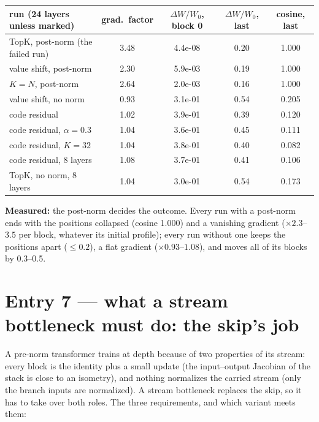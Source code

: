 \documentclass[11pt,a4paper]{article}
\begin{document}
\begin{center}\small
\begin{tabular}{lcccc}
\toprule
run (24 layers unless marked) & grad.\ factor & \(\Delta W/W_0\), block 0 & \(\Delta W/W_0\), last & cosine, last \\
\midrule
TopK, post-norm (the failed run) & 3.48 & 4.4e{-}08 & 0.20 & 1.000 \\
value shift, post-norm & 2.30 & 5.9e{-}03 & 0.19 & 1.000 \\
\(K=N\), post-norm & 2.64 & 2.0e{-}03 & 0.16 & 1.000 \\
value shift, no norm & 0.93 & 3.1e{-}01 & 0.54 & 0.205 \\
code residual & 1.02 & 3.9e{-}01 & 0.39 & 0.120 \\
code residual, \(\alpha=0.3\) & 1.04 & 3.6e{-}01 & 0.45 & 0.111 \\
code residual, \(K=32\) & 1.04 & 3.8e{-}01 & 0.40 & 0.082 \\
code residual, 8 layers & 1.08 & 3.7e{-}01 & 0.41 & 0.106 \\
TopK, no norm, 8 layers & 1.04 & 3.0e{-}01 & 0.54 & 0.173 \\
\bottomrule
\end{tabular}
\end{center}

\textbf{Measured:} the post-norm decides the outcome.  Every run with a post-norm ends with the
positions collapsed (cosine 1.000) and a vanishing gradient (\(\times2.3\)--\(3.5\) per block, whatever its
initial profile); every run without one keeps the positions apart (\(\le0.2\)), a flat gradient
(\(\times0.93\)--\(1.08\)), and moves all of its blocks by 0.3--0.5.

\section{Entry 7 --- what a stream bottleneck must do: the skip's job}

A pre-norm transformer trains at depth because of two properties of its stream:
every block is the identity plus a small update (the input--output Jacobian of
the stack is close to an isometry), and nothing normalizes the carried stream
(only the branch inputs are normalized).  A stream bottleneck replaces the skip,
so it has to take over both roles.  The three requirements, and which variant
meets them:
\end{document}
